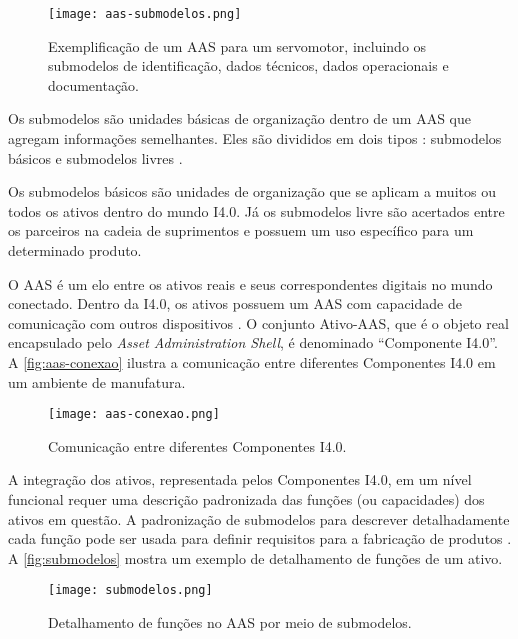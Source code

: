 \begin{figure}[htb]
	\centering
	\texttt{[image: aas-submodelos.png]}
	\caption{Exemplificação de um AAS para um servomotor, incluindo os submodelos de identificação, dados técnicos, dados operacionais e documentação.}
	\label{fig:aas-submodelos}
\end{figure}

Os submodelos são unidades básicas de organização dentro de um AAS que agregam informações semelhantes. Eles são divididos em dois tipos \cite{plattform2019detailsaas}: submodelos básicos e submodelos livres \cite{bader2019aas}.

Os submodelos básicos são unidades de organização que se aplicam a muitos ou todos os ativos dentro do mundo I4.0. Já os submodelos livre são acertados entre os parceiros na cadeia de suprimentos e possuem um uso específico para um determinado produto.

O AAS é um elo entre os ativos reais e seus correspondentes digitais no mundo conectado. Dentro da I4.0, os ativos possuem um AAS com capacidade de comunicação com outros dispositivos \cite{bader2019aas}. O conjunto Ativo-AAS, que é o objeto real encapsulado pelo \textit{Asset Administration Shell}, é denominado ``Componente I4.0''. A \autoref{fig:aas-conexao} ilustra a comunicação entre diferentes Componentes I4.0 em um ambiente de manufatura.

\begin{figure}[htb]
	\centering
	\texttt{[image: aas-conexao.png]}
	\caption{Comunicação entre diferentes Componentes I4.0.}
	\label{fig:aas-conexao}
\end{figure}

A integração dos ativos, representada pelos Componentes I4.0, em um nível funcional requer uma descrição padronizada das funções (ou capacidades) dos ativos em questão. A padronização de submodelos para descrever detalhadamente cada função pode ser usada para definir requisitos para a fabricação de produtos \cite{bedenbender2017aasexamples}. A \autoref{fig:submodelos} mostra um exemplo de detalhamento de funções de um ativo.

\begin{figure}[htb]
	\centering
	\texttt{[image: submodelos.png]}
	\caption{Detalhamento de funções no AAS por meio de submodelos.}
	\label{fig:submodelos}
\end{figure}

